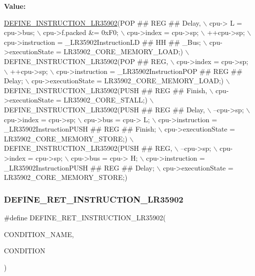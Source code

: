 {\bfseries Value\+:}
\begin{DoxyCode}
\mbox{\hyperlink{isa-lr35902_8c_a3128fc43c5d01e8b51f67901c0b4b5ef}{DEFINE\_INSTRUCTION\_LR35902}}(POP ## REG ## Delay, \(\backslash\)
        cpu-> L = cpu->bus; \(\backslash\)
        cpu->f.packed &= 0xF0; \(\backslash\)
        cpu->index = cpu->sp; \(\backslash\)
        ++cpu->sp; \(\backslash\)
        cpu->instruction = \_LR35902InstructionLD ## HH ## \_Bus; \(\backslash\)
        cpu->executionState = LR35902\_CORE\_MEMORY\_LOAD;) \(\backslash\)
    DEFINE\_INSTRUCTION\_LR35902(POP ## REG, \(\backslash\)
        cpu->index = cpu->sp; \(\backslash\)
        ++cpu->sp; \(\backslash\)
        cpu->instruction = \_LR35902InstructionPOP ## REG ## Delay; \(\backslash\)
        cpu->executionState = LR35902\_CORE\_MEMORY\_LOAD;) \(\backslash\)
    DEFINE\_INSTRUCTION\_LR35902(PUSH ## REG ## Finish, \(\backslash\)
        cpu->executionState = LR35902\_CORE\_STALL;) \(\backslash\)
    DEFINE\_INSTRUCTION\_LR35902(PUSH ## REG ## Delay, \(\backslash\)
        --cpu->sp; \(\backslash\)
        cpu->index = cpu->sp; \(\backslash\)
        cpu->bus = cpu-> L; \(\backslash\)
        cpu->instruction = \_LR35902InstructionPUSH ## REG ## Finish; \(\backslash\)
        cpu->executionState = LR35902\_CORE\_MEMORY\_STORE;) \(\backslash\)
    DEFINE\_INSTRUCTION\_LR35902(PUSH ## REG, \(\backslash\)
        --cpu->sp; \(\backslash\)
        cpu->index = cpu->sp; \(\backslash\)
        cpu->bus = cpu-> H; \(\backslash\)
        cpu->instruction = \_LR35902InstructionPUSH ## REG ## Delay; \(\backslash\)
        cpu->executionState = LR35902\_CORE\_MEMORY\_STORE;)
\end{DoxyCode}
\mbox{\label{isa-lr35902_8c_a41a05eae4ccf30d568a134fd8f774a01}} 
\subsubsection{\texorpdfstring{D\+E\+F\+I\+N\+E\+\_\+\+R\+E\+T\+\_\+\+I\+N\+S\+T\+R\+U\+C\+T\+I\+O\+N\+\_\+\+L\+R35902}{DEFINE\_RET\_INSTRUCTION\_LR35902}}
{\footnotesize\ttfamily \#define D\+E\+F\+I\+N\+E\+\_\+\+R\+E\+T\+\_\+\+I\+N\+S\+T\+R\+U\+C\+T\+I\+O\+N\+\_\+\+L\+R35902(\begin{DoxyParamCaption}\item[{}]{C\+O\+N\+D\+I\+T\+I\+O\+N\+\_\+\+N\+A\+ME,  }\item[{}]{C\+O\+N\+D\+I\+T\+I\+ON }\end{DoxyParamCaption})}

